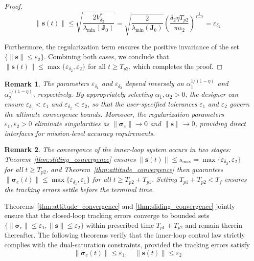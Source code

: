 \documentclass[journal]{new-aiaa}
\newtheorem{remark}{Remark}
\begin{document}
\begin{proof}
\begin{equation}
\|\boldsymbol{s}(t)\| \le \sqrt{\frac{2V^*_{\delta_2}}{\lambda_{\min}(\boldsymbol{J}_0)}}
= \sqrt{\frac{2}{\lambda_{\min}(\boldsymbol{J}_0)}} \left( \frac{\delta_2 \eta T_{p2}}{\pi \alpha_2} \right)^{\frac{1}{1 - \eta}}
= \varepsilon_{\delta_2}
\end{equation}

Furthermore, the regularization term ensures the positive invariance of the set $\{ \|\boldsymbol{s}\| \le \varepsilon_2 \}$. 
Combining both cases, we conclude that $\|\boldsymbol{s}(t)\| \le \max\{\varepsilon_{\delta_2}, \varepsilon_2\}$ for all $t \ge T_{p2}$, 
which completes the proof.
\end{proof}

\begin{remark}
The parameters $\varepsilon_{\delta_1}$ and $\varepsilon_{\delta_2}$ depend inversely on $\alpha_1^{1/(1-\eta)}$ and $\alpha_2^{1/(1-\eta)}$, respectively.
By appropriately selecting $\alpha_1, \alpha_2 > 0$, the designer can ensure $\varepsilon_{\delta_1} < \varepsilon_1$ and $\varepsilon_{\delta_2} < \varepsilon_2$,
so that the user-specified tolerances $\varepsilon_1$ and $\varepsilon_2$ govern the ultimate convergence bounds.
Moreover, the regularization parameters $\varepsilon_1, \varepsilon_2 > 0$ eliminate singularities as $\|\boldsymbol{\sigma}_e\| \to 0$
and $\|\boldsymbol{s}\| \to 0$, providing direct interfaces for mission-level accuracy requirements.
\end{remark}

\begin{remark}
The convergence of the inner-loop system occurs in two stages: Theorem~\ref{thm:sliding_convergence} ensures
$\|\boldsymbol{s}(t)\|\le s_{\max} = \max\{\varepsilon_{\delta_2},\varepsilon_2\}$ for all $t\ge T_{p2}$, and
Theorem~\ref{thm:attitude_convergence} then guarantees $\|\boldsymbol{\sigma}_e(t)\|\le \max\{\varepsilon_{\delta_1},\varepsilon_1\}$
for all $t\ge T_{p2}+T_{p1}$. Setting $T_{p1}+T_{p2}<T_f$ ensures the tracking errors settle before the terminal time.
\end{remark}

Theorems~\ref{thm:attitude_convergence} and \ref{thm:sliding_convergence} jointly ensure that the closed-loop tracking errors converge to 
bounded sets $\{\|\boldsymbol{\sigma}_e\| \le \varepsilon_1, \|\boldsymbol{s}\| \le \varepsilon_2\}$ 
within prescribed time $T_{p1}+T_{p2}$ and remain therein thereafter.
The following theorems verify that the inner-loop control law strictly complies with the dual-saturation constraints, provided the tracking errors satisfy
\begin{equation}
\|\boldsymbol{\sigma}_e(t)\|\le \varepsilon_1, \quad \|\boldsymbol{s}(t)\|\le \varepsilon_2
\label{eq:error_bounds_condition}
\end{equation}
\end{document}
